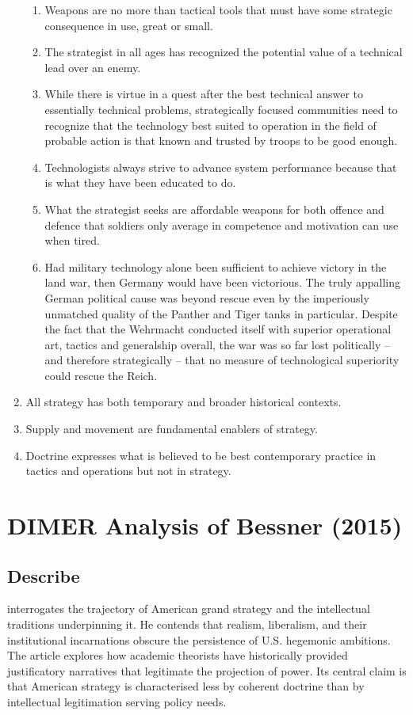 \begin{enumerate}
	\begin{enumerate}
		\item Weapons are no more than tactical tools that must have some strategic consequence in use, great or small.
		\item The strategist in all ages has recognized the potential value of a technical lead over an enemy.
		\item While there is virtue in a quest after the best technical answer to essentially technical problems, strategically focused communities need to recognize that the technology best suited to operation in the field of probable action is that known and trusted by troops to be good enough.
		\item Technologists always strive to advance system performance because that is what they have been educated to do.
		\item What the strategist seeks are affordable weapons for both offence and defence that soldiers only average in competence and motivation can use when tired.
		\item Had military technology alone been sufficient to achieve victory in the land war, then Germany would have been victorious. The truly appalling German political cause was beyond rescue even by the imperiously unmatched quality of the Panther and Tiger tanks in particular. Despite the fact that the Wehrmacht conducted itself with superior operational art, tactics and generalship overall, the war was so far lost politically – and therefore strategically – that no measure of technological superiority could rescue the Reich.
	\end{enumerate}
	\item All strategy has both temporary and broader historical contexts.
	\item Supply and movement are fundamental enablers of strategy.
	\item Doctrine expresses what is believed to be best contemporary practice in tactics and operations but not in strategy.
\end{enumerate}

\section*{DIMER Analysis of Bessner (2015)}

\subsection*{Describe}
\textcite{BESSNER_2015} interrogates the trajectory of American grand strategy and the intellectual traditions underpinning it. He contends that realism, liberalism, and their institutional incarnations obscure the persistence of U.S. hegemonic ambitions. The article explores how academic theorists have historically provided justificatory narratives that legitimate the projection of power. Its central claim is that American strategy is characterised less by coherent doctrine than by intellectual legitimation serving policy needs.

